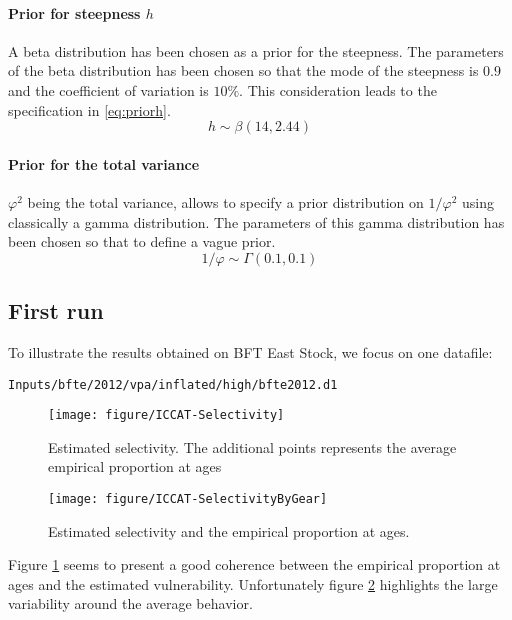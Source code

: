 \paragraph{Prior for steepness $h$}
A beta distribution has been chosen as a prior for the steepness. The parameters of the beta distribution has been chosen so that the mode of the steepness is $0.9$ and the coefficient of variation is 
$10\%$. This consideration leads to the specification in \ref{eq:priorh}.
\begin{equation}
h \sim \beta\left(14, 2.44\right)
\label{eq:priorh}
\end{equation}


\paragraph{Prior for the total variance}
$\varphi^2$ being the total variance, \iscam allows to specify a prior distribution on $1/\varphi^2$ using classically a gamma distribution. The parameters of this gamma distribution has been chosen so that to define a vague prior.
\begin{equation}
1/\varphi \sim \Gamma\left(0.1, 0.1\right)
\label{eq:priorphi}
\end{equation}

\subsection{First run}
To illustrate the results obtained on BFT East Stock, we focus on one datafile: 

\verb+Inputs/bfte/2012/vpa/inflated/high/bfte2012.d1+

\begin{center}
 \begin{figure}[bt]
 \texttt{[image: figure/ICCAT-Selectivity]}
 \caption{Estimated selectivity. The additional points represents the average empirical proportion at ages}
\label{fig:sel1}
\end{figure}
 \begin{figure}[bt]
 \texttt{[image: figure/ICCAT-SelectivityByGear]} 
\caption{Estimated selectivity and the empirical proportion at ages.}
\label{fig:sel2}
\end{figure}

\end{center}

Figure \ref{fig:sel1} seems to present a good coherence between the empirical proportion at ages and the estimated vulnerability. Unfortunately figure \ref{fig:sel2} highlights the large variability around the average behavior.

